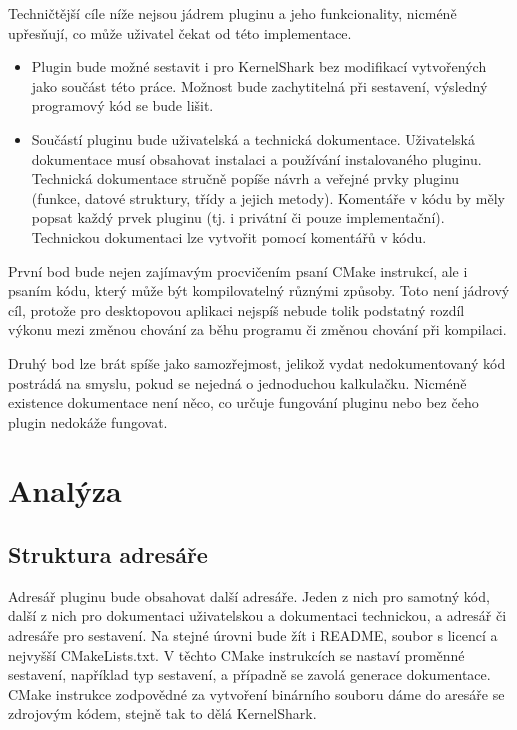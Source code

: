 Techničtější cíle níže nejsou jádrem pluginu a jeho funkcionality, nicméně upřesňují, co může uživatel čekat od této implementace.

\begin{itemize}
    \item Plugin bude možné sestavit i pro KernelShark bez modifikací vytvořených jako součást této práce. Možnost bude zachytitelná při sestavení, výsledný programový kód se bude lišit.
    \item Součástí pluginu bude uživatelská a technická dokumentace. Uživatelská dokumentace musí obsahovat instalaci a používání instalovaného pluginu. Technická dokumentace stručně popíše návrh a veřejné prvky pluginu (funkce, datové struktury, třídy a jejich metody). Komentáře v kódu by měly popsat každý prvek pluginu (tj. i privátní či pouze implementační). Technickou dokumentaci lze vytvořit pomocí komentářů v kódu.
\end{itemize}

První bod bude nejen zajímavým procvičením psaní CMake instrukcí, ale i psaním kódu, který může být kompilovatelný různými způsoby. Toto není jádrový cíl, protože pro desktopovou aplikaci nejspíš nebude tolik podstatný rozdíl výkonu mezi změnou chování za běhu programu či změnou chování při kompilaci.

Druhý bod lze brát spíše jako samozřejmost, jelikož vydat nedokumentovaný kód postrádá na smyslu, pokud se nejedná o jednoduchou kalkulačku. Nicméně existence dokumentace není něco, co určuje fungování pluginu nebo bez čeho plugin nedokáže fungovat.

\section{Analýza}

\subsection*{Struktura adresáře}

Adresář pluginu bude obsahovat další adresáře. Jeden z nich pro samotný kód, další z nich pro dokumentaci uživatelskou a dokumentaci technickou, a adresář či adresáře pro sestavení. Na stejné úrovni bude žít i README, soubor s licencí a nejvyšší CMakeLists.txt. V těchto CMake instrukcích se nastaví proměnné sestavení, například typ sestavení, a případně se zavolá generace dokumentace. CMake instrukce zodpovědné za vytvoření binárního souboru dáme do aresáře se zdrojovým kódem, stejně tak to dělá KernelShark.

